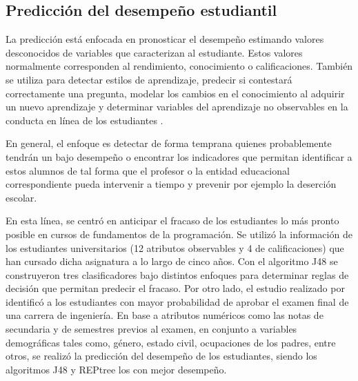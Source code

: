 
 


\subsection{Predicción del desempeño estudiantil}
La predicción está enfocada en pronosticar el desempeño estimando valores desconocidos de variables que caracterizan al estudiante. Estos valores normalmente corresponden al rendimiento, conocimiento o calificaciones. También se utiliza para detectar estilos de aprendizaje, predecir si contestará correctamente una pregunta, modelar los cambios en el conocimiento al adquirir un nuevo aprendizaje y determinar variables del aprendizaje no observables en la conducta en línea de los estudiantes \parencite{romero2010educational}. 

En general, el enfoque es detectar de forma temprana quienes probablemente tendrán un bajo desempeño o encontrar los indicadores que permitan identificar a estos alumnos de tal forma que el profesor o la entidad educacional correspondiente pueda intervenir a tiempo y prevenir por ejemplo la deserción escolar. 

En esta línea, \textcite{antunes2010anticipating} se centró en anticipar el fracaso de los estudiantes lo más pronto posible en cursos de fundamentos de la programación. Se utilizó la información de los estudiantes universitarios (12 atributos observables y 4 de calificaciones) que han cursado dicha asignatura a lo largo de cinco años. Con el algoritmo J48 se construyeron tres clasificadores bajo distintos enfoques para determinar reglas de decisión que permitan predecir el fracaso. Por otro lado, el estudio realizado por \textcite{kumar2016predicting} identificó a los estudiantes con mayor probabilidad de aprobar el examen final de una carrera de ingeniería. En base a atributos numéricos como las notas de secundaria y de semestres previos al examen, en conjunto a variables demográficas tales como, género, estado civil, ocupaciones de los padres, entre otros, se realizó la predicción del desempeño de los estudiantes, siendo los algoritmos J48 y REPtree los con mejor desempeño.

